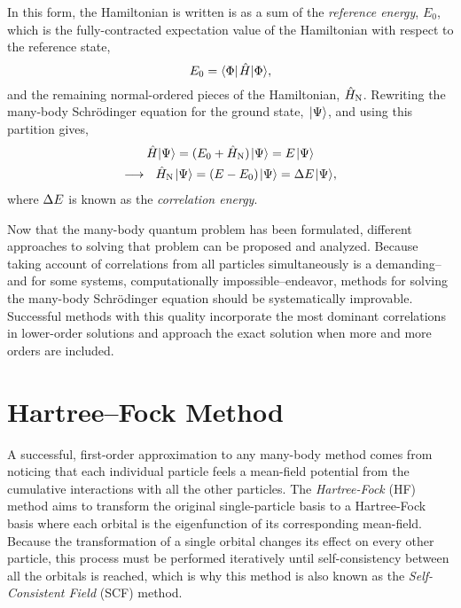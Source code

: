 \documentclass[thesis.tex]{subfiles}
\begin{document}
In this form, the Hamiltonian is written is as a sum of the \textit{reference energy}, $E_{0}$, which is the fully-contracted expectation value of the Hamiltonian with respect to the reference state,
\begin{equation}
  E_{0} = \element{\Phi}{\Ham}{\Phi},
\end{equation}
and the remaining normal-ordered pieces of the Hamiltonian, $\hat{H}_{\mathrm{N}}$.  Rewriting the many-body Schr\"{o}dinger equation for the ground state, $\hspace{1pt}\lvert \Psi \rangle$, and using this partition gives,
\begin{gather} \label{eq:normal_schrodinger}
  \Ham\ket{\Psi} = (E_{0} + \HamN)\ket{\Psi} = E\ket{\Psi} \notag \\
  \longrightarrow\ \ \HamN\ket{\Psi} = (E - E_{0})\ket{\Psi} = \Ecorr\ket{\Psi},
\end{gather}
where $\Delta E$ is known as the \textit{correlation energy}.

Now that the many-body quantum problem has been formulated, different approaches to solving that problem can be proposed and analyzed.  Because taking account of correlations from all particles simultaneously is a demanding--and for some systems, computationally impossible--endeavor, methods for solving the many-body Schr\"{o}dinger equation should be systematically improvable. Successful methods with this quality incorporate the most dominant correlations in lower-order solutions and approach the exact solution when more and more orders are included.

\section{Hartree--Fock Method}
A successful, first-order approximation to any many-body method comes from noticing that each individual particle feels a mean-field potential from the cumulative interactions with all the other particles.  The \textit{Hartree-Fock} (HF) method \cite{HARTREE1928,FOCK1930} aims to transform the original single-particle basis to a Hartree-Fock basis where each orbital is the eigenfunction of its corresponding mean-field.  Because the transformation of a single orbital changes its effect on every other particle, this process must be performed iteratively until self-consistency between all the orbitals is reached, which is why this method is also known as the \textit{Self-Consistent Field} (SCF) method.
\end{document}
